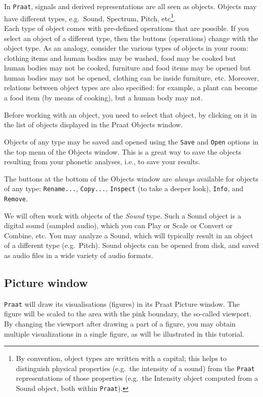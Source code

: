\documentclass[
]{book}
\begin{document}
In \texttt{Praat}, signals and derived representations are all seen as objects. Objects may have different types, e.g.~Sound, Spectrum, Pitch, etc\footnote{By convention, object types are written with a capital; this helps to distinguish physical properties (e.g.~the intensity of a sound) from the \texttt{Praat} representations of those properties (e.g.~the Intensity object computed from a Sound object, both within \texttt{Praat}).}.\\
Each type of object comes with pre-defined operations that are possible. If you select an object of a different type, then the buttons (operations) change with the object type.
As an analogy, consider the various types of objects in your room: clothing items and human bodies may be washed, food may be cooked but human bodies may not be cooked, furniture and food items may be opened but human bodies may not be opened, clothing can be inside furniture, etc. Moreover, relations between object types are also specified: for example, a plant can become a food item (by means of cooking), but a human body may not.

Before working with an object, you need to select that object, by clicking on it in the list of objects displayed in the Praat Objects window.

Objects of any type may be saved and opened using the \texttt{Save} and \texttt{Open} options in the top menu of the Objects window. This is a great way to save the objects resulting from your phonetic analyses, i.e., to save your results.

The buttons at the bottom of the Objects window are \emph{always} available for objects of any type: \texttt{Rename...}, \texttt{Copy...}, \texttt{Inspect} (to take a deeper look), \texttt{Info}, and \texttt{Remove}.

We will often work with objects of the \emph{Sound} type. Such a Sound object is a digital sound (sampled audio), which you can Play or Scale or Convert or Combine, etc. You may analyze a Sound, which will typically result in an object of a different type (e.g.~Pitch). Sound objects can be opened from disk, and saved as audio files in a wide variety of audio formats.

\subsection*{Picture window}\label{picture-window}

\texttt{Praat} will draw its visualisations (figures) in its Praat Picture window. The figure will be scaled to the area with the pink boundary, the so-called viewport. By changing the viewport after drawing a part of a figure, you may obtain multiple visualizations in a single figure, as will be illustrated in this tutorial.
\end{document}

